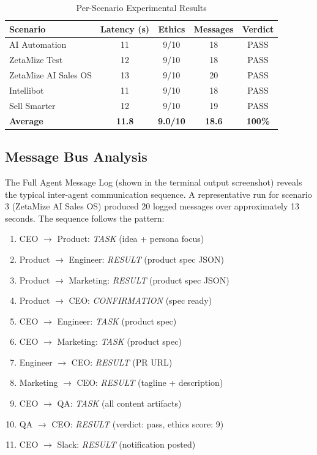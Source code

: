 \documentclass[conference]{IEEEtran}
\begin{document}
\begin{table}[htbp]
\centering
\caption{Per-Scenario Experimental Results}
\label{tab:results}
\renewcommand{\arraystretch}{1.2}
\begin{tabular}{>{\raggedright}p{2.1cm} c c c c}
\toprule
\textbf{Scenario} & \textbf{Latency (s)} & \textbf{Ethics} & \textbf{Messages} & \textbf{Verdict} \\
\midrule
AI Automation        & 11 & 9/10 & 18 & PASS \\
ZetaMize Test        & 12 & 9/10 & 18 & PASS \\
ZetaMize AI Sales OS & 13 & 9/10 & 20 & PASS \\
Intellibot           & 11 & 9/10 & 18 & PASS \\
Sell Smarter         & 12 & 9/10 & 19 & PASS \\
\midrule
\textbf{Average}     & \textbf{11.8} & \textbf{9.0/10} & \textbf{18.6} & \textbf{100\%} \\
\bottomrule
\end{tabular}
\end{table}

\subsection{Message Bus Analysis}

The Full Agent Message Log (shown in the terminal output screenshot) reveals the typical inter-agent communication sequence. A representative run for scenario 3 (ZetaMize AI Sales OS) produced 20 logged messages over approximately 13 seconds. The sequence follows the pattern:

\begin{enumerate}
    \item CEO $\rightarrow$ Product: \textit{TASK} (idea + persona focus)
    \item Product $\rightarrow$ Engineer: \textit{RESULT} (product spec JSON)
    \item Product $\rightarrow$ Marketing: \textit{RESULT} (product spec JSON)
    \item Product $\rightarrow$ CEO: \textit{CONFIRMATION} (spec ready)
    \item CEO $\rightarrow$ Engineer: \textit{TASK} (product spec)
    \item CEO $\rightarrow$ Marketing: \textit{TASK} (product spec)
    \item Engineer $\rightarrow$ CEO: \textit{RESULT} (PR URL)
    \item Marketing $\rightarrow$ CEO: \textit{RESULT} (tagline + description)
    \item CEO $\rightarrow$ QA: \textit{TASK} (all content artifacts)
    \item QA $\rightarrow$ CEO: \textit{RESULT} (verdict: pass, ethics score: 9)
    \item CEO $\rightarrow$ Slack: \textit{RESULT} (notification posted)
\end{enumerate}
\end{document}
